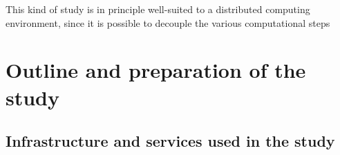 \documentclass[smallextended]{svjour3}       %
\begin{document}
This kind of study is in principle well-suited to a distributed computing environment, since it is possible to decouple the various computational steps 
\section{Outline and preparation of the study}
\label{sec:outline}
\subsection{Infrastructure and services used in the study}


\end{document}
